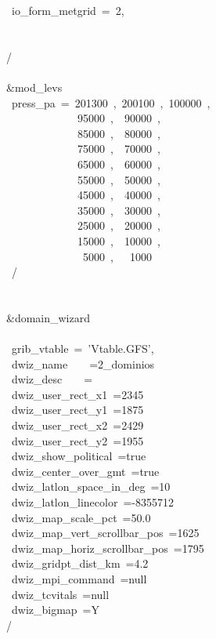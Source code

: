 ~io\_form\_metgrid~=~2,\\
\\
\\
/\\
\\
\&mod\_levs\\
~press\_pa~=~201300~,~200100~,~100000~,\\
~~~~~~~~~~~~~95000~,~~90000~,\\
~~~~~~~~~~~~~85000~,~~80000~,\\
~~~~~~~~~~~~~75000~,~~70000~,\\
~~~~~~~~~~~~~65000~,~~60000~,\\
~~~~~~~~~~~~~55000~,~~50000~,\\
~~~~~~~~~~~~~45000~,~~40000~,\\
~~~~~~~~~~~~~35000~,~~30000~,\\
~~~~~~~~~~~~~25000~,~~20000~,\\
~~~~~~~~~~~~~15000~,~~10000~,\\
~~~~~~~~~~~~~~5000~,~~~1000\\
~/\\
\\
\\
\&domain\_wizard\\
\\
~grib\_vtable~=~'Vtable.GFS',\\
~dwiz\_name~~~~=2\_dominios\\
~dwiz\_desc~~~~=\\
~dwiz\_user\_rect\_x1~=2345\\
~dwiz\_user\_rect\_y1~=1875\\
~dwiz\_user\_rect\_x2~=2429\\
~dwiz\_user\_rect\_y2~=1955\\
~dwiz\_show\_political~=true\\
~dwiz\_center\_over\_gmt~=true\\
~dwiz\_latlon\_space\_in\_deg~=10\\
~dwiz\_latlon\_linecolor~=-8355712\\
~dwiz\_map\_scale\_pct~=50.0\\
~dwiz\_map\_vert\_scrollbar\_pos~=1625\\
~dwiz\_map\_horiz\_scrollbar\_pos~=1795\\
~dwiz\_gridpt\_dist\_km~=4.2\\
~dwiz\_mpi\_command~=null\\
~dwiz\_tcvitals~=null\\
~dwiz\_bigmap~=Y\\
/\\

